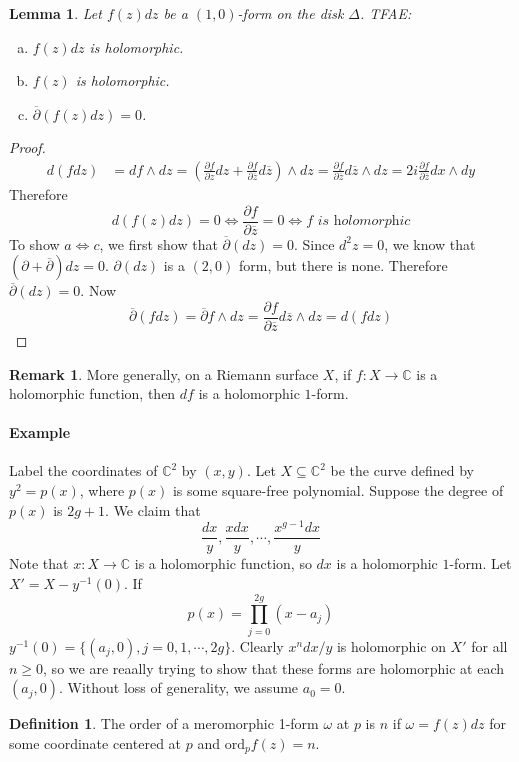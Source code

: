\documentclass[12pt]{article}
\theoremstyle{plain}
\newtheorem{lemma}[equation]{Lemma}
\theoremstyle{definition}
\newtheorem{definition}[equation]{Definition}
\newtheorem{remark}[equation]{Remark}
\newcommand{\IC}{\mathbb{C}}
\newcommand{\<}{\langle}
\renewcommand{\>}{\rangle}
\newcommand{\w}{\omega}
\newcommand{\ord}{\mathrm{ord}}
\newcommand{\bp}{\overline{\partial}}
\newcommand{\p}{\partial}
\newcommand{\bz}{\overline{z}}
\begin{document}
\begin{lemma}
Let $f(z) dz$ be a $(1, 0)$-form on the disk $\Delta$. TFAE:
\begin{enumerate}[a.]
\item $f(z)dz$ is holomorphic. 
\item $f(z)$ is holomorphic. 
\item $\bp(f(z)dz) = 0$. 
\end{enumerate} 
\end{lemma}
\begin{proof}
\begin{align*}
d(fdz) &= df \wedge dz = (\frac{\p f}{\p z} dz + \frac{\p f}{\p \bz} d \bz) \wedge dz = \frac{\p f}{\p \bz} d \bz \wedge d z = 2i \frac{\p f}{\p \bz} dx \wedge dy
\end{align*}
Therefore 
$$ d(f(z)dz) = 0 \iff \frac{\p f}{\p \bz} = 0 \iff f \textit{ is holomorphic}$$
To show $a \iff c$, we first show that $\bp (dz) = 0$. Since $d^2 z = 0$, we know that $(\p + \bp) dz = 0$. $\p (dz)$ is a $(2, 0)$ form, but there is none. Therefore $\bp(dz) = 0$. Now 
$$ \bp (fdz) = \bp f \wedge dz = \frac{\p f}{\p \bz} d\bz \wedge dz = d(fdz) $$
\end{proof}
\begin{remark}
More generally, on a Riemann surface $X$, if $f : X \to \IC$ is a holomorphic function, then $df$ is a holomorphic $1$-form. 
\end{remark}

\paragraph{Example} Label the coordinates of $\IC^2$ by $(x, y)$. Let $X \subseteq \IC^2$ be the curve defined by $y^2 = p(x)$, where $p(x)$ is some square-free polynomial. Suppose the degree of $p(x)$ is $2g + 1$. We claim that 
$$ \frac{dx}{y}, \frac{x dx}{y}, \cdots, \frac{x^{g - 1} dx}{y} $$
Note that $x: X \to \IC$ is a holomorphic function, so $dx$ is a holomorphic $1$-form. Let $X' = X - y^{-1}(0)$. If 
$$ p(x) = \prod_{j = 0}^{2g} (x - a_j) $$
$y^{-1}(0) = \{ (a_j, 0), j = 0, 1, \cdots, 2g \}$. Clearly $x^n dx /y$ is holomorphic on $X'$ for all $n \ge 0$, so we are reaally trying to show that these forms are holomorphic at each $(a_j, 0)$. Without loss of generality, we assume $a_0 = 0$.  


\begin{definition}
The order of a meromorphic 1-form $\w$ at $p$ is $n$ if $\w = f(z) dz $ for some coordinate centered at $p$ and $\ord_p f(z) = n$. 
\end{definition}
\end{document}
